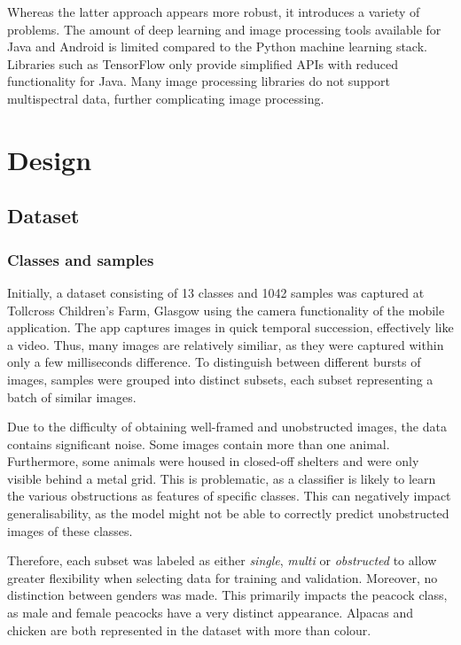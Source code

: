 \documentclass{l4proj}
\begin{document}
Whereas the latter approach appears more robust, it introduces a variety of problems. The amount of deep learning and image processing tools available for Java and Android is limited compared to the Python machine learning stack. Libraries such as TensorFlow only provide simplified APIs with reduced functionality for Java. Many image processing libraries do not support multispectral data, further complicating image processing.



\chapter{Design}
\label{design}

\section{Dataset}

\subsection{Classes and samples}
\label{classes_samples}

Initially, a dataset consisting of 13 classes and 1042 samples was captured at Tollcross Children's Farm, Glasgow using the camera functionality of the mobile application. The app captures images in quick temporal succession, effectively like a video. Thus, many images are relatively similiar, as they were captured within only a few milliseconds difference. To distinguish between different bursts of images, samples were grouped into distinct subsets, each subset representing a batch of similar images.

Due to the difficulty of obtaining well-framed and unobstructed images, the data contains significant noise. Some images contain more than one animal. Furthermore, some animals were housed in closed-off shelters and were only visible behind a metal grid. This is problematic, as a classifier is likely to learn the various obstructions as features of specific classes. This can negatively impact generalisability, as the model might not be able to correctly predict unobstructed images of these classes.

Therefore, each subset was labeled as either \textit{single}, \textit{multi} or \textit{obstructed} to allow greater flexibility when selecting data for training and validation. Moreover, no distinction between genders was made. This primarily impacts the peacock class, as male and female peacocks have a very distinct appearance. Alpacas and chicken are both represented in the dataset with more than colour.
\end{document}
